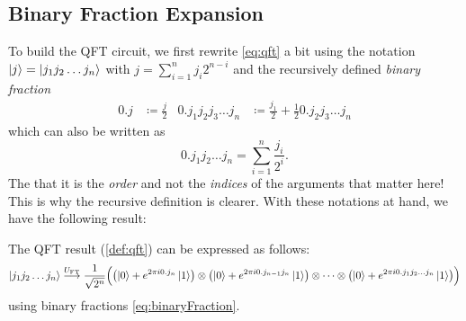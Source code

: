		\subsection{Binary Fraction Expansion}
			To build the \ac{QFT} circuit, we first rewrite \eqref{eq:qft} a bit using the notation \( \ket{j} = \ket{j_1 j_2 \dots j_n} \) with \( j = \sum_{i = 1}^{n} j_i 2^{n - i} \) and the recursively defined \emph{binary fraction}
			\begin{align}
				0.j &\coloneqq \frac{j}{2} &
				0.j_1 j_2 j_3 \dots j_n &\coloneqq \frac{j_1}{2} + \frac{1}{2} 0.j_2 j_3 \dots j_n
				\label{eq:binaryFraction}
			\end{align}
			which can also be written as
			\begin{equation}
				0.j_1 j_2 \dots j_n = \sum_{i = 1}^{n} \frac{j_i}{2^i}.
			\end{equation}
			The that it is the \emph{order} and not the \emph{indices} of the arguments that matter here! This is why the recursive definition is clearer. With these notations at hand, we have the following result:
			\begin{theorem}
				The \ac{QFT} result (\autoref{def:qft}) can be expressed as follows:
				\begin{equation}
					\ket{j_1 j_2 \dots j_n}
					\overset{U_\mathrm{FT}}{\longrightarrow}
					\frac{1}{\sqrt{2^n}} \Bigl( \bigl( \ket{0} + e^{2 \pi i 0.j_n} \ket{1} \bigr) \otimes \bigl( \ket{0} + e^{2 \pi i 0.j_{n - 1} j_n} \ket{1} \bigr) \otimes \dots \otimes \bigl( \ket{0} + e^{2 \pi i 0.j_1 j_2 \dots j_n} \ket{1} \bigr) \Bigr)
				\end{equation}
				using binary fractions \eqref{eq:binaryFraction}.
			\end{theorem}
